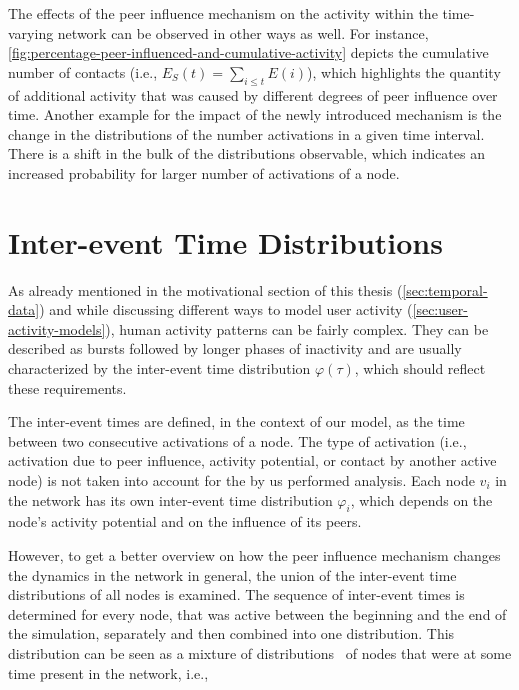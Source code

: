 The effects of the peer influence mechanism on the activity within the time-varying network can be observed in other ways as well.
For instance, \cref{fig:percentage-peer-influenced-and-cumulative-activity} depicts the cumulative number of contacts (i.e., \( E_{S}(t) = \sum_{i \leq t} E(i) \)), which highlights the quantity of additional activity that was caused by different degrees of peer influence over time.
Another example for the impact of the newly introduced mechanism is the change in the distributions of the number activations in a given time interval.
There is a shift in the bulk of the distributions observable, which indicates an increased probability for larger number of activations of a node.




\section{Inter-event Time Distributions}
\label{sec:inter-event-time-dists}

As already mentioned in the motivational section of this thesis (\cref{sec:temporal-data}) and while discussing different ways to model user activity (\cref{sec:user-activity-models}), human activity patterns can be fairly complex.
They can be described as bursts followed by longer phases of inactivity and are usually characterized by the inter-event time distribution \( \varphi(\tau) \), which should reflect these requirements.

The inter-event times are defined, in the context of our model, as the time between two consecutive activations of a node.
The type of activation (i.e., activation due to peer influence, activity potential, or contact by another active node) is not taken into account for the by us performed analysis.
Each node \( v_{i} \) in the network has its own inter-event time distribution \( \varphi_{i} \), which depends on the node's activity potential and on the influence of its peers.

However, to get a better overview on how the peer influence mechanism changes the dynamics in the network in general, the union of the inter-event time distributions of all nodes is examined.
The sequence of inter-event times is determined for every node, that was active between the beginning and the end of the simulation, separately and then combined into one distribution.
This distribution can be seen as a mixture of distributions~\cite{Seidel2011} of nodes that were at some time present in the network, i.e.,

